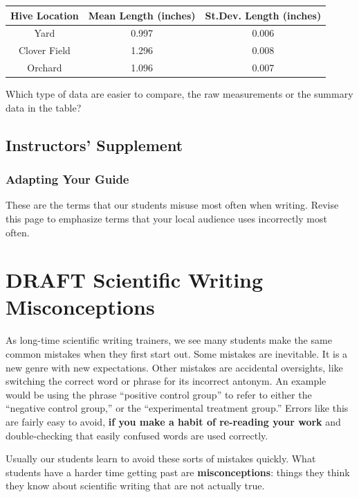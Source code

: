 \documentclass[
]{book}
\begin{document}
\begin{longtable}[]{@{}ccc@{}}
\toprule
Hive Location & Mean Length (inches) & St.Dev. Length (inches) \\
\midrule
\endhead
Yard & 0.997 & 0.006 \\
Clover Field & 1.296 & 0.008 \\
Orchard & 1.096 & 0.007 \\
\bottomrule
\end{longtable}

Which type of data are easier to compare, the raw measurements or the summary data in the table?

\hypertarget{instructors-supplement-1}{%
\section{Instructors' Supplement}\label{instructors-supplement-1}}

\hypertarget{adapting-your-guide-1}{%
\subsection{Adapting Your Guide}\label{adapting-your-guide-1}}

These are the terms that our students misuse most often when writing. Revise this page to emphasize terms that your local audience uses incorrectly most often.

\hypertarget{draft-scientific-writing-misconceptions}{%
\chapter{DRAFT Scientific Writing Misconceptions}\label{draft-scientific-writing-misconceptions}}

As long-time scientific writing trainers, we see many students make the same common mistakes when they first start out. Some mistakes are inevitable. It is a new genre with new expectations. Other mistakes are accidental oversights, like switching the correct word or phrase for its incorrect antonym. An example would be using the phrase ``positive control group'' to refer to either the ``negative control group,'' or the ``experimental treatment group.'' Errors like this are fairly easy to avoid, \textbf{if you make a habit of re-reading your work} and double-checking that easily confused words are used correctly.

Usually our students learn to avoid these sorts of mistakes quickly. What students have a harder time getting past are \textbf{misconceptions}: things they think they know about scientific writing that are not actually true.
\end{document}
